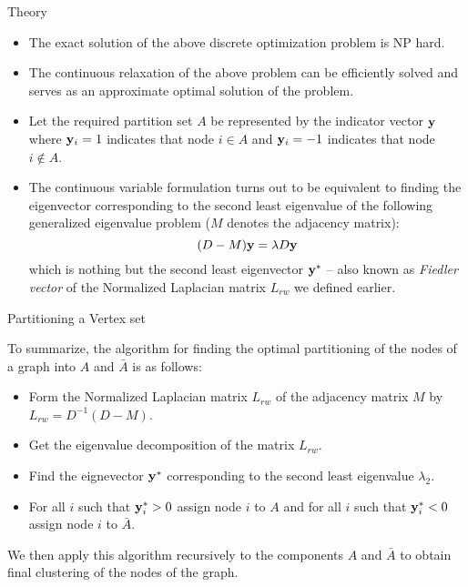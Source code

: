 \documentclass{beamer}
\begin{document}
\begin{frame}{Theory}
\begin{itemize}
  \item The exact solution of the above discrete optimization problem
    is NP hard.
  \item The continuous relaxation of the above problem can be
    efficiently solved and serves as an approximate optimal solution
    of the problem.
  \item Let the required partition set $A$ be represented by the
    indicator vector ${\bf y}$ where ${\bf y}_i = 1$ indicates that
    node $i \in A$ and ${\bf y}_i = -1$ indicates that node $i \notin
    A$. 
  \item The continuous variable formulation turns out to be equivalent
    to finding the eigenvector corresponding to the second least
    eigenvalue of the following generalized eigenvalue problem
    \cite{shimalik} ($M$ denotes the adjacency matrix):
$$
(D-M){\bf y} = \lambda D{\bf y}
$$
 which is nothing but the second least eigenvector ${\bf y}^*$ -- also known as
     {\it Fiedler vector} of the Normalized Laplacian matrix $L_{rw}$
     we defined earlier.
\end{itemize}
\end{frame}

\begin{frame}{Partitioning a Vertex set}


To summarize, the algorithm for finding the optimal partitioning of
the nodes of a graph into $A$ and $\bar{A}$ is as follows:

\begin{itemize}
  \item Form the Normalized Laplacian matrix $L_{rw}$ of the adjacency
    matrix $M$ by $L_{rw} = D^{-1}(D-M)$.
  \item Get the eigenvalue decomposition of the matrix $L_{rw}$.
  \item Find the eignevector ${\bf y}^*$ corresponding to the second least
    eigenvalue $\lambda_2$.
  \item For all $i$ such that ${\bf y}_i^* > 0$ assign node $i$ to $A$ and for all
    $i$ such that ${\bf y}_i^* < 0$ assign node $i$ to $\bar{A}$.
\end{itemize}

We then apply this algorithm recursively to the components $A$ and
$\bar{A}$ to obtain final clustering of the nodes of the graph.

\end{frame}
\end{document}

